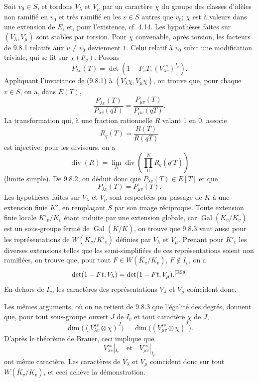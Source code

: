 \documentclass[10pt,letterpaper]{article}
\newcommand{\Gal}{\operatorname{Gal}}
\providecommand{\Gal}{\operatorname{Gal}}
\providecommand{\Gal}{\operatorname{Gal}}
\providecommand{\Gal}{\operatorname{Gal}}
\providecommand{\Gal}{\operatorname{Gal}}
\newcommand{\auditmark}[1]{\textsuperscript{\normalfont\scriptsize[E#1]}}
\begin{document}
Soit $v_0\in S$, et tordons $V_\lambda$ et $V_\mu$ par un caractère $\chi$ du groupe des classes d'idèles non ramifié en $v_0$ et très ramifié en les $v\in S$ autres que $v_0$; $\chi$ est à valeurs dans une extension de $E$, et, pour l'existence, cf. 4.14. Les hypothèses faites sur $(V_\lambda,V_\mu)$ sont stables par torsion. Pour $\chi$ convenable, après torsion, les facteurs de 9.8.1 relatifs aux $v\ne v_0$ deviennent $1$. Celui relatif à $v_0$ subit une modification triviale, qui se lit sur $\chi(F_v)$. Posons
\[
P_{\lambda v}(T)=\det(1-F_vT,(V_{\lambda v}^{ss})^{I_v}).
\]
Appliquant l'invariance de (9.8.1) à $(V_\lambda\chi,V_\mu\chi)$, on trouve que, pour chaque $v\in S$, on a, dans $E(T)$,
\[
\tag{9.8.2}
\frac{P_{\lambda v}(T)}{P_{\lambda v}(qT)}=
\frac{P_{\mu v}(T)}{P_{\mu v}(qT)}.
\]
La transformation qui, à une fraction rationnelle $R$ valant $1$ en $0$, associe
\[
R_q(T)=\frac{R(T)}{R(qT)}
\]
est injective: pour les diviseurs, on a
\[
\operatorname{div}(R)=\lim_N \operatorname{div}\left(\prod_{0}^{N}R_q(q^iT)\right)
\]
(limite simple). De 9.8.2, on déduit donc que $P_{\lambda v}(T)\in E[T]$ et que
\[
\tag{9.8.3}
P_{\lambda v}(T)=P_{\mu v}(T).
\]
Les hypothèses faites sur $V_\lambda$ et $V_\mu$ sont respectées par passage de $K$ à une extension finie $K'$, en remplaçant $S$ par son image réciproque. Toute extension finie locale $K'_v/K_v$ étant induite par une extension globale, car $\Gal(\overline K_v/K_v)$ est un sous-groupe fermé de $\Gal(\overline K/K)$, on trouve que 9.8.3 vaut aussi pour les représentations de $W(\overline K_v/K'_v)$ définies par $V_\lambda$ et $V_\mu$. Prenant pour $K'_v$ les diverses extensions telles que les semi-simplifiées de ces représentations soient non ramifiées, on trouve que, pour tout $F\in W(\overline K_v/K_v)$, $F\notin I_v$, on a
\[
\det(1-Ft,V_\lambda)=\det(1-Ft,V_\mu).\auditmark{58}
\]
En dehors de $I_v$, les caractères des représentations $V_\lambda$ et $V_\mu$ coïncident donc.

Les mêmes arguments, où on ne retient de 9.8.3 que l'égalité des degrés, donnent que, pour tout sous-groupe ouvert $J$ de $I_v$ et tout caractère $\chi$ de $J$,
\[
\dim\bigl((V_{\lambda v}^{ss}\otimes\chi)^J\bigr)
=
\dim\bigl((V_{\mu v}^{ss}\otimes\chi)^J\bigr).
\]
D'après le théorème de Brauer, ceci implique que
\[
V_{\lambda v}^{ss}|_{I_v}\quad\text{et}\quad V_{\mu v}^{ss}|_{I_v}
\]
ont même caractère. Les caractères de $V_\lambda$ et $V_\mu$ coïncident donc sur tout $W(\overline K_v/K_v)$, et ceci achève la démonstration.
\end{document}
